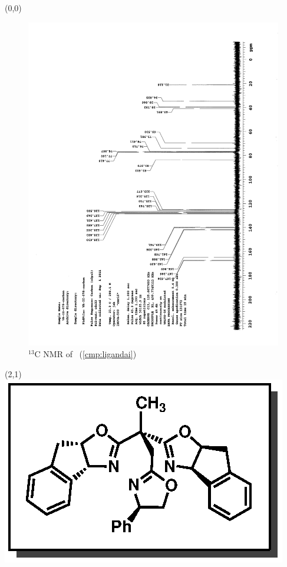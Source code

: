 \clearpage
\begin{textblock}{20}(0,0)
\begin{figure}[htb]
\caption{$^{13}$C NMR of  \CMPligandai\ (\ref{cmp:ligandai})}
\includegraphics[scale=0.75, trim = 0mm 0mm 0mm 5mm,
clip]{chp_asymmetric/images/nmr/ligandaiC}
\vspace{-100pt}
\end{figure}
\end{textblock}
\begin{textblock}{1}(2,1)
\includegraphics[scale=0.8, angle=90]{chp_asymmetric/images/ligandai}
\end{textblock}
\clearpage

